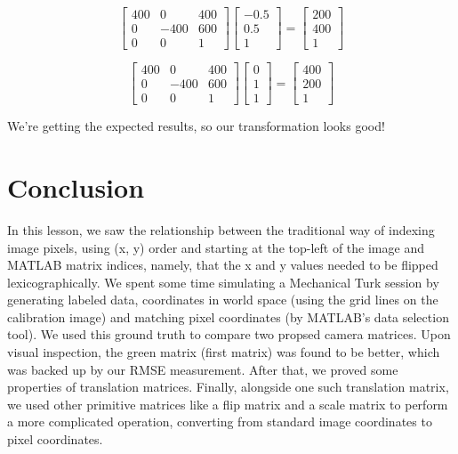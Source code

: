 \documentclass{article}
\begin{document}
$$
\begin{bmatrix}
400 &    0 & 400 \\
  0 & -400 & 600 \\
  0 &    0 & 1
\end{bmatrix} \begin{bmatrix}
-0.5\\
 0.5\\
1
\end{bmatrix} = \begin{bmatrix}
200\\
400\\
1
\end{bmatrix}
$$

$$
\begin{bmatrix}
400 &    0 & 400 \\
  0 & -400 & 600 \\
  0 &    0 & 1
\end{bmatrix} \begin{bmatrix}
0\\
1\\
1
\end{bmatrix} = \begin{bmatrix}
400\\
200\\
1
\end{bmatrix}
$$

We're getting the expected results, so our transformation looks good!

\section{Conclusion}

In this lesson, we saw the relationship between the traditional way of indexing 
image pixels, using (x, y) order and starting at the top-left of the image and 
MATLAB matrix indices, namely, that the x and y values needed 
to be flipped lexicographically. We spent 
some time simulating a Mechanical Turk session by generating labeled data, 
coordinates in world space (using the grid lines on the calibration image) and 
matching pixel coordinates (by MATLAB's data selection tool). We used this 
ground truth to compare two propsed camera matrices. Upon visual inspection, the 
green matrix (first matrix) was found to be better, which was backed up by our 
RMSE measurement. After that, we proved some properties of translation matrices. 
Finally, alongside one such translation matrix, we used other primitive matrices like a 
flip matrix and a scale matrix to perform a more complicated operation, 
converting from standard image coordinates to 
pixel coordinates.
\end{document}
